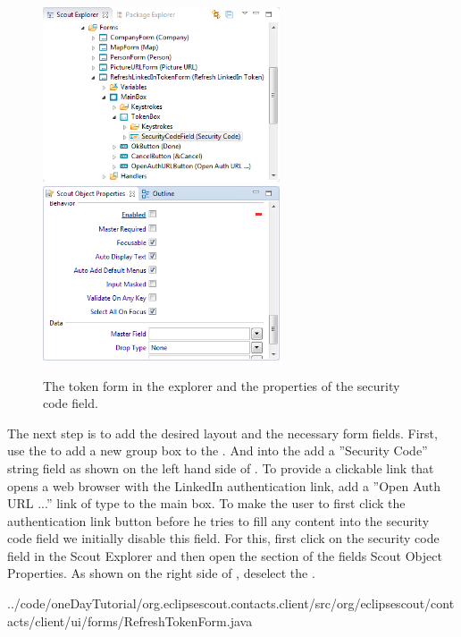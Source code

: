 \documentclass[a4paper,10pt,twoside]{book}
\begin{document}
\begin{figure}
\includegraphics[width=7cm]{tokenform_securitycode_explorer.png} \hspace{5mm}
\includegraphics[width=7cm]{tokenform_securitycode_properties.png}
\caption{The token form in the explorer and the properties of the security code field.}
\end{figure}

The next step is to add the desired layout and the necessary form fields. 
First, use the  to add a new group box  to the . 
And into the  add a ''Security Code'' string field as shown on the left hand side of . 
To provide a clickable link that opens a web browser with the LinkedIn authentication link, add a ''Open Auth URL ...'' link of type  to the main box. 
To make the user to first click the authentication link button before he tries to fill any content into the security code field we initially disable this field. 
For this, first click on the security code field in the Scout Explorer and then open the  section of the fields Scout Object Properties. 
As shown on the right side of , deselect the .


{../code/oneDayTutorial/org.eclipsescout.contacts.client/src/org/eclipsescout/contacts/client/ui/forms/RefreshTokenForm.java}
\end{document}
